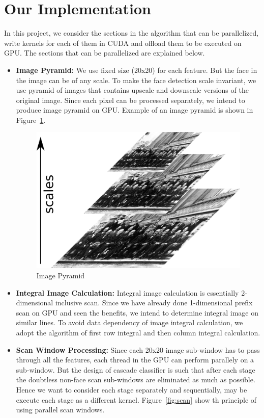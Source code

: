 \section{Our Implementation }\label{sec:impl}

In this project, we consider the sections in the algorithm that
can be parallelized, write kernels for each of them in CUDA
and offload them to be executed on GPU. The sections that
can be parallelized are explained below.

\vspace{0.1in}
\begin{itemize}

\item \textbf{Image Pyramid:}
We use fixed size (20x20) for each feature. But the face in the image can be of any scale. 
To make the face detection scale  invariant, we use pyramid of images that contains upscale and
downscale versions of the original image. Since each pixel can be processed separately, 
we intend to produce image pyramid on GPU. Example of an image pyramid is shown in Figure~\ref{fig:scale}.

\begin{figure}[h]
  \centering
  \includegraphics[width=0.65\linewidth]{figs/scale.jpg}
  \caption{Image Pyramid \textnormal{\small }  }
  \label{fig:scale}
\end{figure}


\item \textbf{Integral Image Calculation:}
Integral image calculation is essentially 2-dimensional inclusive scan. Since we have already done 
1-dimensional prefix scan on GPU and seen the benefits, we intend to determine integral image on 
similar lines.
To avoid data dependency of image integral calculation, we adopt the algorithm of first 
row integral and then column integral calculation.

\vspace{0.1in}
\item \textbf{Scan Window Processing:}
Since each 20x20 image sub-window has to pass through all the features, each thread in the GPU 
can perform parallely on a sub-window. But the design of cascade classifier is such that after 
each stage the doubtless non-face scan sub-windows are eliminated as much as possible. Hence we 
want to consider each stage separately and sequentially, may be execute each stage as a different kernel.
Figure~\ref{fig:scan} show th principle of using parallel scan windows. 


\end{itemize}
